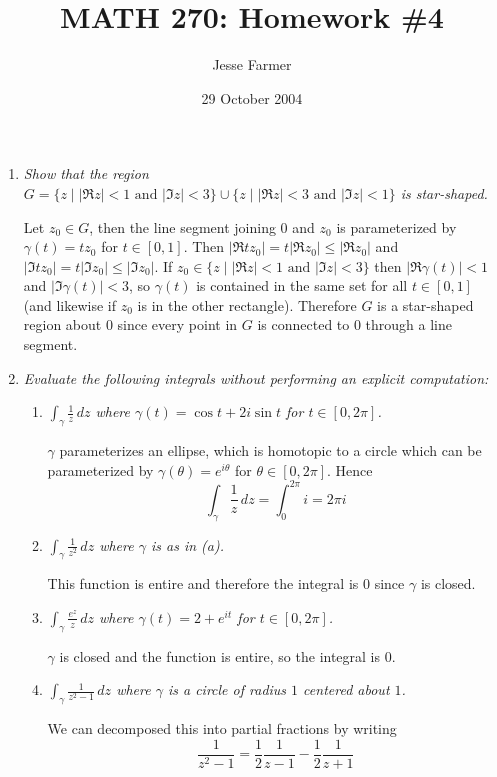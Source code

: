 \documentclass[letterpaper, 11pt]{article}
\title{MATH 270: Homework \#4}
\author{Jesse Farmer}
\date{29 October 2004}
\begin{document}
\maketitle
\begin{enumerate}

\item \emph{Show that the region $G = \{z \mid |\Re z| < 1 \mbox{ and } |\Im z| < 3\} \cup \{z \mid |\Re z| < 3 \mbox{ and } |\Im z| < 1\}$ is star-shaped.}

Let $z_0 \in G$, then the line segment joining $0$ and $z_0$ is parameterized by $\gamma(t) = tz_0$ for $t \in [0,1]$.  Then $|\Re tz_0 | = t|\Re z_0| \leq |\Re z_0|$ and $|\Im tz_0| = t|\Im z_0| \leq |\Im z_0|$.  If $z_0 \in \{z \mid |\Re z| < 1 \mbox{ and } |\Im z| < 3\}$ then $|\Re\gamma(t)| < 1$ and $|\Im\gamma(t)| < 3$, so $\gamma(t)$ is contained in the same set for all $t \in [0,1]$ (and likewise if $z_0$ is in the other rectangle).  Therefore $G$ is a star-shaped region about $0$ since every point in $G$ is connected to $0$ through a line segment.

\item \emph{Evaluate the following integrals without performing an explicit computation:}
\begin{enumerate}
\item \emph{$\int_{\gamma} \frac{1}{z}\,dz$ where $\gamma(t) = \cos t + 2i\sin t$ for $t \in [0,2\pi]$.}

$\gamma$ parameterizes an ellipse, which is homotopic to a circle which can be parameterized by $\gamma(\theta) = e^{i\theta}$ for $\theta \in [0,2 \pi]$.  Hence
\[
\int_{\gamma} \frac{1}{z}\,dz = \int_0^{2\pi} i = 2 \pi i
\]

\item \emph{$\int_{\gamma} \frac{1}{z^2}\,dz$ where $\gamma$ is as in (a).}

This function is entire and therefore the integral is $0$ since $\gamma$ is closed.

\item \emph{$\int_{\gamma} \frac{e^z}{z} \,dz$ where $\gamma(t) = 2 + e^{it}$ for $t \in [0,2\pi]$.}

$\gamma$ is closed and the function is entire, so the integral is $0$.

\item \emph{$\int_{\gamma} \frac{1}{z^2-1} \,dz$ where $\gamma$ is a circle of radius $1$ centered about $1$.}

We can decomposed this into partial fractions by writing
\[
\frac{1}{z^2-1} = \frac{1}{2}\frac{1}{z-1} - \frac{1}{2}\frac{1}{z+1}
\]


\end{enumerate}
\end{enumerate}
\end{document}

